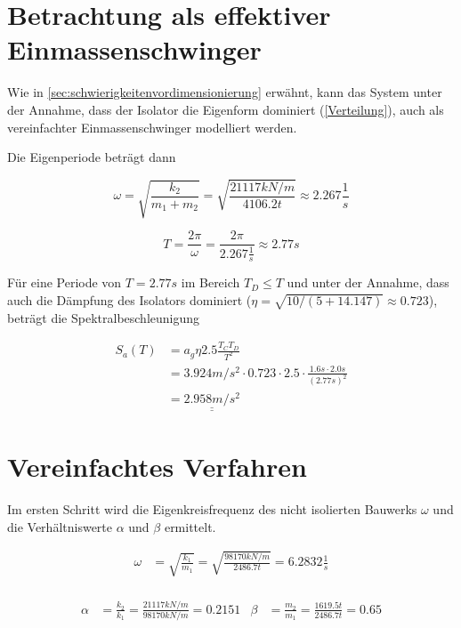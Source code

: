 \pagebreak

\section{Betrachtung als effektiver Einmassenschwinger}

Wie in \cref{sec:schwierigkeitenvordimensionierung} erwähnt, kann das System unter der Annahme, dass der Isolator die Eigenform dominiert (\cref{Verteilung}), auch als vereinfachter Einmassenschwinger modelliert werden.

Die Eigenperiode beträgt dann

\begin{equation*}
\omega = \sqrt{\frac{k_2}{m_1 + m_2}} = \sqrt{\frac{21117 kN/m}{4106.2 t}} \approx 2.267 \frac{1}{s}
\end{equation*}

\begin{equation*}
T = \frac{2 \pi}{\omega} = \frac{2 \pi}{2.267 \frac{1}{s}} \approx 2.77 s
\end{equation*}

Für eine Periode von $T = 2.77 s$ im Bereich $T_D \leq T$ und unter der Annahme, dass auch die Dämpfung des Isolators dominiert ($\eta=\sqrt{10/(5+14.147)} \approx 0.723$), beträgt die Spektralbeschleunigung

\begin{align*}
S_a(T) &= a_g \eta 2.5 \frac{T_C T_D}{T^2}\\
       &= 3.924 m/s^2 \cdot 0.723 \cdot 2.5 \cdot \frac{1.6 s \cdot 2.0 s}{(2.77 s)^2}\\
       &= \underline{\underline{2.958 m/s^2}}
\end{align*}

\section{Vereinfachtes Verfahren}

Im ersten Schritt wird die Eigenkreisfrequenz des nicht isolierten Bauwerks $\omega$ und die Verhältniswerte $\alpha$ und $\beta$ ermittelt.

\begin{align*}
\omega &= \sqrt{\frac{k_1}{m_1}} = \sqrt{\frac{98170 kN/m}{2486.7 t}} = 6.2832 \frac{1}{s}\\
\end{align*}

\begin{align*}
\alpha &= \frac{k_2}{k_1} = \frac{21117 kN/m}{98170 kN/m} = 0.2151 & \beta  &= \frac{m_2}{m_1} = \frac{1619.5 t}{2486.7 t} = 0.65\\
\end{align*}

